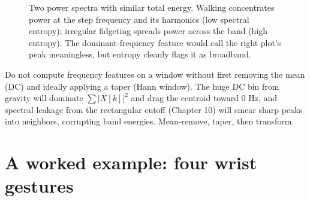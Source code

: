 \begin{figure}[H]
\centering
{}
\hspace{0.4cm}
\caption{Two power spectra with similar total energy. Walking concentrates power
at the step frequency and its harmonics (low spectral entropy); irregular
fidgeting spreads power across the band (high entropy). The dominant-frequency
feature would call the right plot's peak meaningless, but entropy cleanly flags it
as broadband.}
\label{ch38:fig-spectra}
\end{figure}

\begin{trapbox}
Do not compute frequency features on a window without first removing the mean (DC)
and ideally applying a taper (Hann window). The huge DC bin from gravity will
dominate $\sum |X[k]|^2$ and drag the centroid toward 0 Hz, and spectral leakage
from the rectangular cutoff (Chapter 10) will smear sharp peaks into neighbors,
corrupting band energies. Mean-remove, taper, then transform.
\end{trapbox}

\section{A worked example: four wrist gestures}
\label{ch38:worked}


